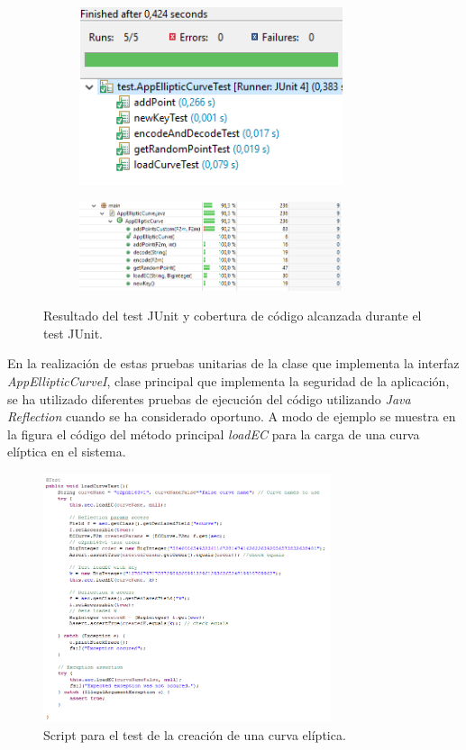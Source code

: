 \documentclass[../PFC.tex]{subfiles}
\begin{document}
\begin{figure}[H]
\centering
	\begin{subfigure}{0.4\textwidth}
		\centering
		\includegraphics[width=0.85\textwidth]{./img/junitTest}
    \end{subfigure}          
    \qquad\qquad\qquad  %
    \begin{subfigure}{0.4\textwidth}  
       \centering
       \includegraphics[width=0.85\textwidth]{./img/coveredCode}
    \end{subfigure}   
  \caption{Resultado del test JUnit y cobertura de código alcanzada durante el test JUnit.}
  \label{img:junitTest}
\end{figure}

En la realización de estas pruebas unitarias de la clase que implementa la interfaz \textit{AppEllipticCurveI}, clase principal que implementa la seguridad de la aplicación, se ha utilizado diferentes pruebas de ejecución del código utilizando \textit{Java Reflection}\cite{javaReflection} cuando se ha considerado oportuno. A modo de ejemplo se muestra en la figura el código del método principal \textit{loadEC} para la carga de una curva elíptica en el sistema.

\begin{figure}[H]
  \centering
  \includegraphics[width=0.75\textwidth]{./img/loadCurveTest}
  \caption{Script para el test de la creación de una curva elíptica.}
  \label{img:loadCurveTest}
\end{figure}
\end{document}
